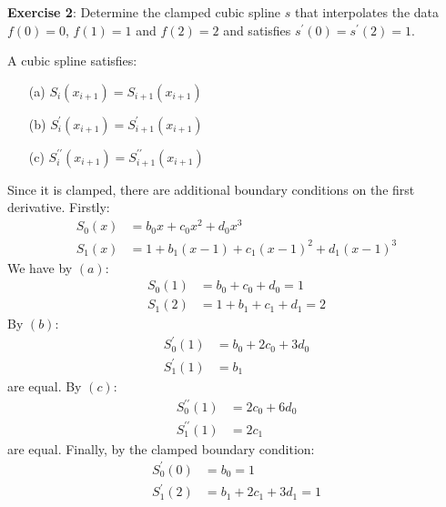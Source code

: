 \documentclass{article}
\begin{document}
\textbf{Exercise 2}: Determine the clamped cubic spline $s$ that interpolates the data $f(0) = 0$, $f(1) = 1$ and $f(2) = 2$ and satisfies $s^{\prime}(0) = s^{\prime}(2) = 1$.
    \begin{answer}
        A cubic spline satisfies:
            \begin{itemize}
                \item [(a)] $S_{i}(x_{i + 1}) = S_{i + 1}(x_{i + 1})$

                \item [(b)] $S^{\prime}_{i}(x_{i + 1}) = S^{\prime}_{i + 1}(x_{i + 1})$

                \item [(c)] $S^{\prime\prime}_{i}(x_{i + 1}) = S^{\prime\prime}_{i + 1}(x_{i + 1})$ 
            \end{itemize}
        Since it is clamped, there are additional boundary conditions on the first derivative. Firstly:
            \begin{align*}
                S_{0}(x) &= b_{0}x + c_{0}x^{2} + d_{0}x^{3}                       \\
                S_{1}(x) &= 1 + b_{1}(x - 1) + c_{1}(x - 1)^{2} + d_{1}(x - 1)^{3}   
            \end{align*}
        We have by $(a)$:
            \begin{align*}
                S_{0}(1) &= b_{0} + c_{0} + d_{0} = 1     \\
                S_{1}(2) &= 1 + b_{1} + c_{1} + d_{1} = 2   
            \end{align*}
        By $(b)$:
            \begin{align*}
                S^{\prime}_{0}(1) &= b_{0} + 2c_{0} + 3d_{0} \\
                S^{\prime}_{1}(1) &= b_{1}                     
            \end{align*}
        are equal. By $(c)$:
            \begin{align*}
                S^{\prime\prime}_{0}(1) &= 2c_{0} + 6d_{0} \\
                S^{\prime\prime}_{1}(1) &= 2c_{1}            
            \end{align*}
        are equal. Finally, by the clamped boundary condition:
            \begin{align*}
                S^{\prime}_{0}(0) &= b_{0} = 1 \\
                S^{\prime}_{1}(2) &= b_{1} + 2c_{1} + 3d_{1} = 1   
            \end{align*}

\end{answer}
\end{document}
